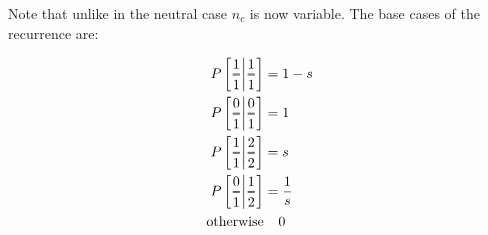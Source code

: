 \documentclass[review]{elsarticle}
\newcommand{\Dfrac}[2]{%
  \ooalign{%
    $\genfrac{}{}{1.2pt}0{#1}{#2}$\cr%
    $\color{white}\genfrac{}{}{.4pt}0{\phantom{#1}}{\phantom{#2}}$}%
}
\newcommand{\cond}{\middle\vert}
\begin{document}
Note that unlike in the neutral case $n_c$ is now variable. The base cases of the recurrence are:

\begin{equation*}
  \begin{aligned}
    P\left[ \Dfrac{1}{1} \cond \Dfrac{1}{1} \right] &= 1-s \\
    P\left[ \Dfrac{0}{1} \cond \Dfrac{0}{1} \right] &= 1 \\
    P\left[ \Dfrac{1}{1} \cond \Dfrac{2}{2} \right] &= s \\
    P\left[ \Dfrac{0}{1} \cond \Dfrac{1}{2} \right] &= \frac{1}{s} \\
    \text{otherwise} &\phantom{{}=} 0
  \end{aligned}
\end{equation*}
\end{document}
